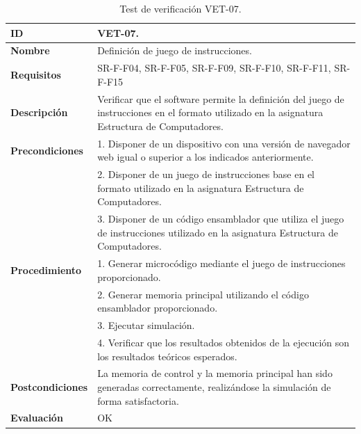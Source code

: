 \begin{center}
\begin{table}[htb]
\centering
\caption{Test de verificación VET-07.}
\begin{tabular}{@{}p{2.5cm} p{13cm}@{}} 
\toprule
\textbf{ID} 					& VET-07. \\
\midrule
\textbf{Nombre} 				& Definición de juego de instrucciones. \\
\midrule
\textbf{Requisitos} 		& SR-F-F04, SR-F-F05, SR-F-F09, SR-F-F10, SR-F-F11, SR-F-F15\\
\midrule
\textbf{Descripción} 		& Verificar que el software permite la definición del juego de instrucciones en el formato utilizado en la asignatura Estructura de Computadores. \\
\midrule
\textbf{Precondiciones}		& 1. Disponer de un dispositivo con una versión de navegador web igual o superior a los indicados anteriormente. \\
											& 2. Disponer de un juego de instrucciones base en el formato utilizado en la asignatura Estructura de Computadores. \\
											& 3. Disponer de un código ensamblador que utiliza el juego de instrucciones utilizado en la asignatura Estructura de Computadores. \\
\midrule
\textbf{Procedimiento}		& 1. Generar microcódigo mediante el juego de instrucciones proporcionado.\\
											& 2. Generar memoria principal utilizando el código ensamblador proporcionado.\\
											& 3. Ejecutar simulación.\\
											& 4. Verificar que los resultados obtenidos de la ejecución son los resultados teóricos esperados.\\
\midrule
\textbf{Postcondiciones} 		&  La memoria de control y la memoria principal han sido generadas correctamente, realizándose la simulación de forma satisfactoria.\\
\midrule
\textbf{Evaluación} 			& OK \\
\bottomrule
\end{tabular}
\label{tab:vet07}
\end{table}
\end{center}

